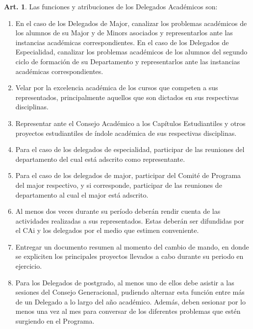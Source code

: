 \documentclass[letterpaper,11pt]{article}
\theoremstyle{definition}%
\newtheorem{art}{Art.} %
\begin{document}
\begin{art}\label{funcionesDelegadosAcademicos}
	Las funciones y atribuciones de los Delegados Académicos son:
	\begin{enumerate}
		\item En el caso de los Delegados de Major, canalizar los problemas académicos de los alumnos de su Major y de Minors asociados y representarlos ante las instancias académicas correspondientes. En el caso de los Delegados de Especialidad, canalizar los problemas académicos de los alumnos del segundo ciclo de formación de su Departamento y representarlos ante las instancias académicas correspondientes.
		\item Velar por la excelencia académica de los cursos que competen a sus representados, principalmente aquellos que son dictados en sus respectivas disciplinas.
		\item Representar ante el Consejo Académico a los Capítulos Estudiantiles y otros proyectos estudiantiles de índole académica de sus respectivas disciplinas.
		\item Para el caso de los delegados de especialidad, participar de las reuniones del departamento del cual está adscrito como representante.
		\item Para el caso de los delegados de major, participar del  Comité de Programa del major respectivo, y si corresponde, participar de las reuniones de departamento al cual el major está adscrito.
		\item Al menos dos veces durante su período deberán rendir cuenta de las actividades realizadas a sus representados. Estas deberán ser difundidas por el CAi y los delegados por el medio que estimen conveniente.
		\item Entregar un documento resumen al momento del cambio de mando, en donde se expliciten los principales proyectos llevados a cabo durante su periodo en ejercicio.
		\item Para los Delegados de postgrado, al menos uno de ellos debe asistir a las sesiones del Consejo Generacional, pudiendo alternar esta función entre más de un Delegado a lo largo del año académico. Además, deben sesionar por lo menos una vez al mes para conversar de los diferentes problemas que estén surgiendo en el Programa.
	\end{enumerate}
\end{art}
\end{document}
